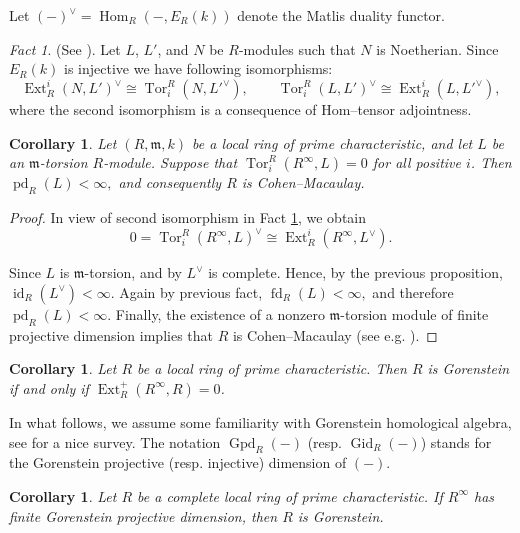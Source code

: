 \documentclass[11pt,a4paper]{amsart}
\numberwithin{equation}{section}
\newtheorem{corollary}[theorem]{Corollary}
\theoremstyle{definition}
\theoremstyle{remark}
\newtheorem{fact}[theorem]{Fact}
\newcommand{\Gpd}{\operatorname{Gpd}}
\newcommand{\Gid}{\operatorname{Gid}}
\newcommand{\fm}{\mathfrak{m}}
\begin{document}
Let $(-)^\vee=\operatorname{Hom}_R(-,E_R(k))$ denote the Matlis duality
functor.

\begin{fact}(See \cite[4.1]{sim}).
	\label{fact:matlis-duality}
	Let $L$, $L'$, and $N$ be $R$-modules such that $N$ is Noetherian. Since $E_R(k)$ is injective we have following isomorphisms:
	\[
	\operatorname{Ext}^i_R(N, L')^\vee \cong \operatorname{Tor}^R_i(N, L'^\vee), \qquad
	\operatorname{Tor}^R_i(L, L')^\vee \cong \operatorname{Ext}^i_R(L, L'^\vee),
	\]where the second isomorphism is a consequence of Hom–tensor adjointness.
\end{fact}	
	
	
	
\begin{corollary}
	Let $(R,\mathfrak m,k)$ be a local ring of prime characteristic, and let
	$L$ be an $\fm$-torsion $R$-module. Suppose that
$
	\operatorname{Tor}_i^R(R^\infty,L)=0$ 
	 {for all positive } $i$.
	Then
$
	\operatorname{pd}_R(L)<\infty,
$
	and consequently $R$ is Cohen--Macaulay.
\end{corollary}

\begin{proof}
In view of  second isomorphism in  Fact \ref{fact:matlis-duality}, we obtain
	\[
	0=
	\operatorname{Tor}_i^R(R^\infty,L)^\vee
	\cong
	\operatorname{Ext}_R^i(R^\infty,L^\vee).
	\]
	
	Since $L$ is $\fm$-torsion, and by \cite[\S 4.2, Lemma]{sim} $L^\vee$ is complete. Hence, by the previous
	proposition,
$
	\operatorname{id}_R(L^\vee)<\infty.
$
Again by previous fact,
$
	\operatorname{fd}_R(L)<\infty,
$
	and therefore
$
	\operatorname{pd}_R(L)<\infty.
$	Finally, the existence of a nonzero $\fm$-torsion module of finite projective
	dimension implies that $R$ is Cohen--Macaulay (see e.g. \cite[Observation 3.15]{moh5}).
\end{proof}
\begin{corollary}\label{25}
	Let $R$ be a local ring of prime characteristic. Then $R$ is Gorenstein if and only if $\operatorname{Ext}_R^+(R^\infty, R) = 0$.
\end{corollary}
In what follows, we assume some familiarity with Gorenstein homological algebra, see \cite{Totally}
for a nice survey.
The notation \(\Gpd_R(-)\) (resp. \(\Gid_R(-)\)) stands for the Gorenstein  projective (resp. injective) dimension of \((-)\).
\begin{corollary}
	Let $R$ be a complete local ring of prime characteristic. If $R^\infty$ has finite Gorenstein projective dimension, then $R$ is Gorenstein.
\end{corollary}
\end{document}
